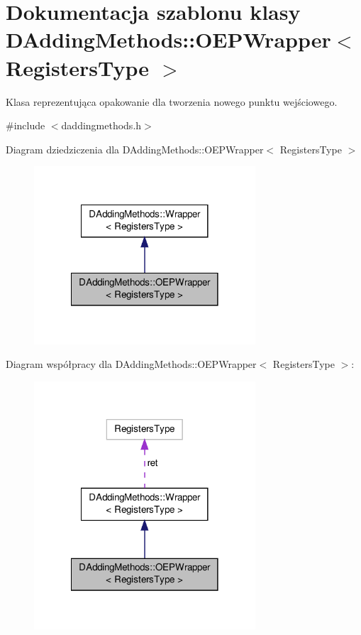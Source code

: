 \hypertarget{class_d_adding_methods_1_1_o_e_p_wrapper}{\section{Dokumentacja szablonu klasy D\-Adding\-Methods\-:\-:O\-E\-P\-Wrapper$<$ Registers\-Type $>$}
\label{class_d_adding_methods_1_1_o_e_p_wrapper}
}


Klasa reprezentująca opakowanie dla tworzenia nowego punktu wejściowego.  




{\ttfamily \#include $<$daddingmethods.\-h$>$}



Diagram dziedziczenia dla D\-Adding\-Methods\-:\-:O\-E\-P\-Wrapper$<$ Registers\-Type $>$\nopagebreak
\begin{figure}[H]
\begin{center}
\leavevmode
\includegraphics[width=234pt]{class_d_adding_methods_1_1_o_e_p_wrapper__inherit__graph}
\end{center}
\end{figure}


Diagram współpracy dla D\-Adding\-Methods\-:\-:O\-E\-P\-Wrapper$<$ Registers\-Type $>$\-:\nopagebreak
\begin{figure}[H]
\begin{center}
\leavevmode
\includegraphics[width=234pt]{class_d_adding_methods_1_1_o_e_p_wrapper__coll__graph}
\end{center}
\end{figure}
